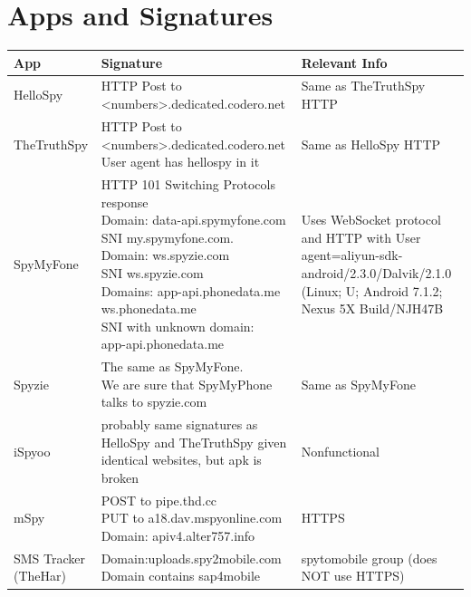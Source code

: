\documentclass[acmtog]{acmart}
\begin{document}
\appendix
\clearpage
\begin{table}
\section{Apps and Signatures}
\begin{tabular}{p{5cm}p{5cm}p{5cm}}
	\toprule
	App & Signature & Relevant Info \\
	\midrule
	HelloSpy & \makecell{HTTP Post to\\ <numbers>.dedicated.codero.net} & Same as TheTruthSpy HTTP \\
	
	TheTruthSpy & \makecell{HTTP Post to\\ <numbers>.dedicated.codero.net\\ User agent has hellospy in it} & Same as HelloSpy HTTP \\
	
	SpyMyFone & \makecell{HTTP 101 Switching Protocols\\ response\\
	Domain: data-api.spymyfone.com\\SNI my.spymyfone.com.\\
	Domain: ws.spyzie.com\\SNI ws.spyzie.com\\
	Domains: app-api.phonedata.me\\ws.phonedata.me\\
	SNI with unknown domain:\\ app-api.phonedata.me} & Uses WebSocket protocol and HTTP with User agent=aliyun-sdk-android/2.3.0/Dalvik/2.1.0 (Linux; U; Android 7.1.2; Nexus 5X Build/NJH47B \\

	Spyzie & \makecell{The same as SpyMyFone.\\ We are sure that SpyMyPhone\\ talks to spyzie.com} & Same as SpyMyFone \\
	
	iSpyoo & probably same signatures as HelloSpy and TheTruthSpy given identical websites, but apk is broken & Nonfunctional \\
	
	mSpy & \makecell{POST to pipe.thd.cc\\
	PUT to a18.dav.mspyonline.com\\
	Domain: apiv4.alter757.info} & HTTPS \\
	
	SMS Tracker (TheHar) & \makecell{Domain:uploads.spy2mobile.com\\ Domain contains sap4mobile} & spytomobile group (does NOT use HTTPS) \\
	

\end{tabular}
\end{table}
\end{document}
